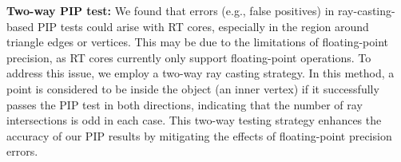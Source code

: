 \textbf{Two-way PIP test:}
We found that errors (e.g., false positives) in ray-casting-based PIP tests could arise with RT cores, especially in the region around triangle edges or vertices.
This may be due to the limitations of floating-point precision, as RT cores currently only support floating-point operations.
To address this issue, we employ a two-way ray casting strategy.
In this method, a point is considered to be inside the object (an inner vertex) if it successfully passes the PIP test in both directions, indicating that the number of ray intersections is odd in each case.
This two-way testing strategy enhances the accuracy of our PIP results by mitigating the effects of floating-point precision errors.



